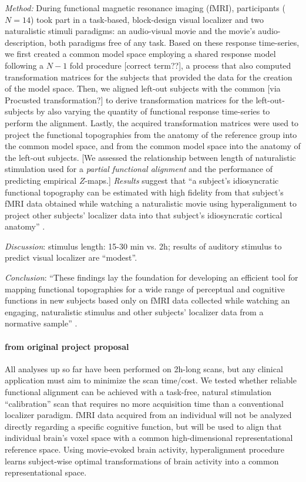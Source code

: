 \textit{Method:}
During functional magnetic resonance imaging (fMRI), participants ($N=14$) took
part in a task-based, block-design visual localizer and two naturalistic stimuli
paradigms: an audio-visual movie and the movie's audio-description, both
paradigms free of any task.
Based on these response time-series, we first created a common model space
employing a shared response model \citep{chen2015reduced} following a $N-1$ fold
procedure [correct term??], a process that also computed transformation matrices
for the subjects that provided the data for the creation of the model space.
Then, we aligned left-out subjects with the common [via Procusted
transformation?] to derive transformation matrices for the left-out-subjects by
also varying the quantity of functional response time-series to perform the
alignment.
Lastly, the acquired transformation matrices were used to project the functional
topographies from the anatomy of the reference group into the common model
space, and from the common model space into the anatomy of the left-out
subjects.
[We assessed the relationship between length of naturalistic stimulation used
for a \textit{partial functional alignment} and the performance of predicting
empirical $Z$-maps.]
%
\textit{Results} suggest that ``a subject's idiosyncratic functional topography
can be estimated with high fidelity from that subject's fMRI data obtained while
watching a naturalistic movie using hyperalignment to project other subjects’
localizer data into that subject's idiosyncratic cortical anatomy''
\citep{jiahui2020predicting}.

%
\textit{Discussion}: stimulus length: 15-30 min vs. 2h;  results of auditory stimulus to predict visual localizer are ``modest''.

%
\textit{Conclusion}: ``These findings lay the foundation for developing an
efficient tool for mapping functional topographies for a wide range of
perceptual and cognitive functions in new subjects based only on fMRI data
collected while watching an engaging, naturalistic stimulus and other subjects'
localizer data from a normative sample'' \citep{jiahui2020predicting}.


\paragraph{from original project proposal}
%
All analyses up so far have been performed on 2h-long scans, but any
clinical application must aim to minimize the scan time/cost.
%
We tested whether reliable functional alignment can be achieved with a task-free,
natural stimulation ``calibration'' scan that requires no more acquisition time
than a conventional localizer paradigm.
%
fMRI data acquired from an individual will not be analyzed directly regarding a
specific cognitive function, but will be used to align that individual brain's
voxel space with a common high-dimensional representational reference space.
%
Using movie-evoked brain activity, hyperalignment procedure learns subject-wise
optimal transformations of brain activity into a common representational space.

